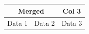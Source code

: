 \documentclass{article}
\begin{document}
\begin{tabular}{|c|c|c|}
\hline
\multicolumn{2}{|c|}{Merged} & Col 3 \\
\hline
Data 1 & Data 2 & Data 3 \\
\hline
\end{tabular}
\end{document}
